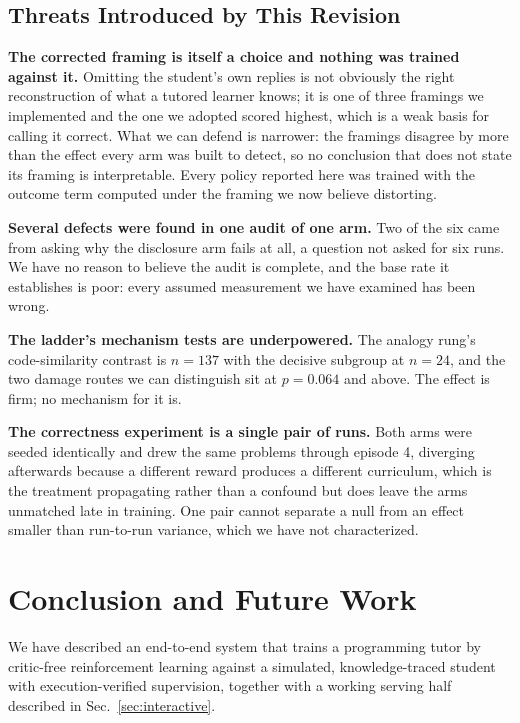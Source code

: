 \documentclass[conference]{IEEEtran}
\begin{document}
\subsection{Threats Introduced by This Revision}

\textbf{The corrected framing is itself a choice and nothing was trained
against it.} Omitting the student's own replies is not obviously the right
reconstruction of what a tutored learner knows; it is one of three framings we
implemented and the one we adopted scored highest, which is a weak basis for
calling it correct. What we can defend is narrower: the framings disagree by
more than the effect every arm was built to detect, so no conclusion that does
not state its framing is interpretable. Every policy reported here was trained
with the outcome term computed under the framing we now believe distorting.

\textbf{Several defects were found in one audit of one arm.} Two of the six
came from asking why the disclosure arm fails at all, a question not asked for
six runs. We have no reason to believe the audit is complete, and the base rate
it establishes is poor: every assumed measurement we have examined has been
wrong.

\textbf{The ladder's mechanism tests are underpowered.} The analogy rung's
code-similarity contrast is $n{=}137$ with the decisive subgroup at $n{=}24$,
and the two damage routes we can distinguish sit at $p{=}0.064$ and above. The
effect is firm; no mechanism for it is.

\textbf{The correctness experiment is a single pair of runs.} Both arms were
seeded identically and drew the same problems through episode 4, diverging
afterwards because a different reward produces a different curriculum, which is
the treatment propagating rather than a confound but does leave the arms
unmatched late in training. One pair cannot separate a null from an effect
smaller than run-to-run variance, which we have not characterized.

\section{Conclusion and Future Work}

We have described an end-to-end system that trains a programming tutor by
critic-free reinforcement learning against a simulated, knowledge-traced
student with execution-verified supervision, together with a working serving
half described in Sec.~\ref{sec:interactive}.
\end{document}

